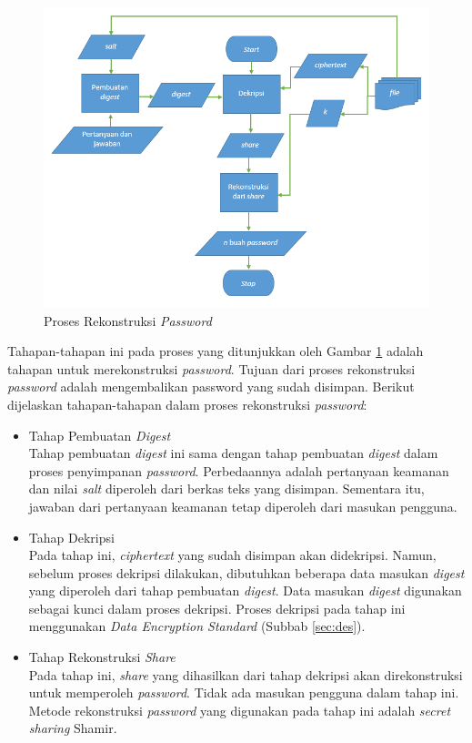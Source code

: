 \begin{figure}[H]
	\centerline{\includegraphics[scale=0.65]{Gambar/flowchart_reconstruct}}
	\caption{Proses Rekonstruksi \textit{Password}}\label{fig:flowchart_reconstruct_secret}
\end{figure}

Tahapan-tahapan ini pada proses yang ditunjukkan oleh Gambar \ref{fig:flowchart_reconstruct_secret} adalah tahapan untuk merekonstruksi \textit{password}. Tujuan dari proses rekonstruksi \textit{password} adalah mengembalikan password yang sudah disimpan. Berikut dijelaskan tahapan-tahapan dalam proses rekonstruksi \textit{password}:

\begin{itemize}
	\item Tahap Pembuatan \textit{Digest} \\
	Tahap pembuatan \textit{digest} ini sama dengan tahap pembuatan \textit{digest} dalam proses penyimpanan \textit{password}. Perbedaannya adalah pertanyaan keamanan dan nilai \textit{salt} diperoleh dari berkas teks yang disimpan. Sementara itu, jawaban dari pertanyaan keamanan tetap diperoleh dari masukan pengguna.
	\item Tahap Dekripsi \\
	Pada tahap ini, \textit{ciphertext} yang sudah disimpan akan didekripsi. Namun, sebelum proses dekripsi dilakukan, dibutuhkan beberapa data masukan \textit{digest} yang diperoleh dari tahap pembuatan \textit{digest}. Data masukan \textit{digest} digunakan sebagai kunci dalam proses dekripsi. Proses dekripsi pada tahap ini menggunakan \textit{Data Encryption Standard} (Subbab \ref{sec:des}).
	\item Tahap Rekonstruksi \textit{Share} \\
	Pada tahap ini, \textit{share} yang dihasilkan dari tahap dekripsi akan direkonstruksi untuk memperoleh \textit{password}. Tidak ada masukan pengguna dalam tahap ini. Metode rekonstruksi \textit{password} yang digunakan pada tahap ini adalah \textit{secret sharing} Shamir.
\end{itemize}

